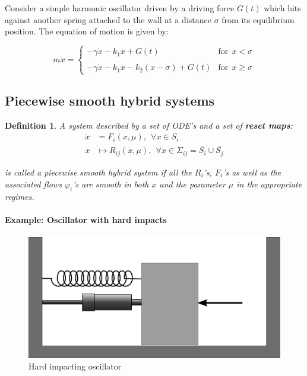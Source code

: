 \documentclass{book}
\renewcommand{\(}{\begin{columns}}
\renewcommand{\)}{\end{columns}}
\newcommand{\<}[1]{\begin{column}{#1}}
\renewcommand{\>}{\end{column}}
\newcommand{\bb}[1]{\textbf{#1}}
\newcommand{\para}{\paragraph}
\newtheorem{definition}{Definition}[section]
\begin{document}
Consider a simple harmonic oscillator driven by a driving force $G(t)$ which 
hits against another spring attached to the wall at a distance $\sigma$ from 
its equilibrium position. The equation of motion is given by:

\begin{equation}
\label{eq-soft_impact}
m\ddot{x}=
\begin{cases} 
-\gamma \dot{x}-k_1x+G(t)&\mathrm{for}~~x<\sigma
\\ \\ 
-\gamma \dot{x}-k_1x-k_2(x-\sigma)+G(t)&\mathrm{for}~~x\geq\sigma 
\end{cases}
\end{equation}

%

\subsection{Piecewise smooth hybrid systems}
\begin{definition}
A system described by a set of ODE's and a set of \bb{reset maps}:
\begin{align}
\label{def-hybrid}
\dot{x}&=F_i(x,\mu),~~\forall x\in S_i\\
x&\mapsto R_{ij}(x,\mu),~~\forall x\in\Sigma_{ij}=\bar{S_i}\cup\bar{S_j}
\end{align}

is called a piecewise smooth hybrid system if all the $R_i$'s, $F_i$'s as well 
as the associated flows $\varphi_i$'s are smooth in both $x$ and the parameter 
$\mu$ in the appropriate regimes.  
\end{definition}

\para{Example: Oscillator with hard impacts\\}
\begin{figure}[!hbp]
\caption{Hard impacting oscillator}
\label{fig-himp}
\begin{center}
\includegraphics[width=0.5\columnwidth]{hardcol}
\end{center}
\end{figure}
\end{document}
